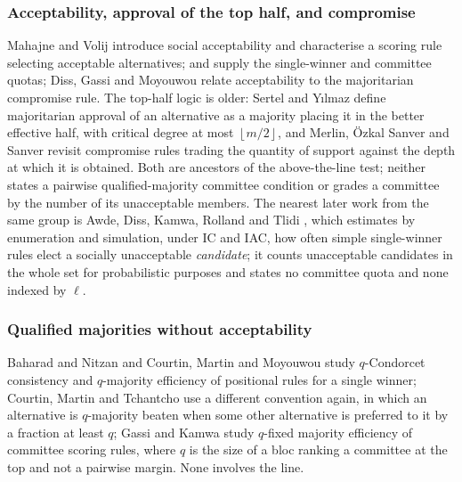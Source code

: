 \documentclass[11pt]{article}
\theoremstyle{plain}
\theoremstyle{definition}
\newcommand{\fl}[1]{\left\lfloor #1\right\rfloor}
\begin{document}
\subsubsection*{Acceptability, approval of the top half, and compromise}
Mahajne and Volij \cite{MahajneVolij2018} introduce social acceptability and characterise a scoring rule selecting acceptable alternatives; \cite{MahajneVolij2019} and \cite{DissMahajne2020} supply the single-winner and committee quotas; Diss, Gassi and Moyouwou \cite{DissGassiMoyouwou2023} relate acceptability to the majoritarian compromise rule. The top-half logic is older: Sertel and Yılmaz \cite{SertelYilmaz1999} define majoritarian approval of an alternative as a majority placing it in the better effective half, with critical degree at most $\fl{m/2}$, and Merlin, \"Ozkal Sanver and Sanver \cite{MerlinEtAl2019} revisit compromise rules trading the quantity of support against the depth at which it is obtained. Both are ancestors of the above-the-line test; neither states a pairwise qualified-majority committee condition or grades a committee by the number of its unacceptable members. The nearest later work from the same group is Awde, Diss, Kamwa, Rolland and Tlidi \cite{AwdeEtAl2023}, which estimates by enumeration and simulation, under IC and IAC, how often simple single-winner rules elect a socially unacceptable \emph{candidate}; it counts unacceptable candidates in the whole set for probabilistic purposes and states no committee quota and none indexed by $\ell$.

\subsubsection*{Qualified majorities without acceptability}
Baharad and Nitzan \cite{BaharadNitzan2003} and Courtin, Martin and Moyouwou \cite{CourtinEtAl2015} study $q$-Condorcet consistency and $q$-majority efficiency of positional rules for a single winner; Courtin, Martin and Tchantcho \cite{CourtinMartinTchantcho2015} use a different convention again, in which an alternative is $q$-majority beaten when some other alternative is preferred to it by a fraction at least $q$; Gassi and Kamwa \cite{GassiKamwa2025} study $q$-fixed majority efficiency of committee scoring rules, where $q$ is the size of a bloc ranking a committee at the top and not a pairwise margin. None involves the line.
\end{document}
